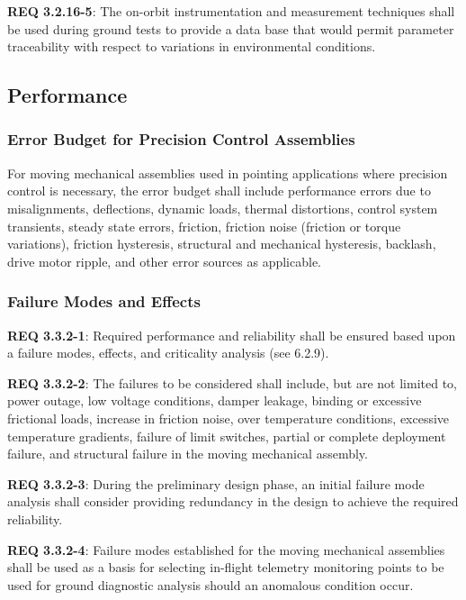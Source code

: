 \documentclass[12pt]{article}
\begin{document}
\noindent \textbf{REQ 3.2.16-5}: The on-orbit instrumentation and measurement techniques shall be used during ground tests to provide a data base that would permit parameter traceability with respect to variations in environmental conditions.


\clearpage
\subsection{Performance} %
\subsubsection{Error Budget for Precision Control Assemblies} %
For moving mechanical assemblies used in pointing applications where precision control is necessary, the error budget shall include performance errors due to misalignments, deflections, dynamic loads, thermal distortions, control system transients, steady state errors, friction, friction noise (friction or torque variations), friction hysteresis, structural and mechanical hysteresis, backlash, drive motor ripple, and other error sources as applicable.


\subsubsection{Failure Modes and Effects} %
\noindent \textbf{REQ 3.3.2-1}: Required performance and reliability shall be ensured based upon a failure modes, effects, and criticality analysis (see 6.2.9). 

\noindent \textbf{REQ 3.3.2-2}: The failures to be considered shall include, but are not limited to, power outage, low voltage conditions, damper leakage, binding or excessive frictional loads, increase in friction noise, over temperature conditions, excessive temperature gradients, failure of limit switches, partial or complete deployment failure, and structural failure in the moving mechanical assembly. 

\noindent \textbf{REQ 3.3.2-3}: During the preliminary design phase, an initial failure mode analysis shall consider providing redundancy in the design to achieve the required reliability. 

\noindent \textbf{REQ 3.3.2-4}: Failure modes established for the moving mechanical assemblies shall be used as a basis for selecting in-flight telemetry monitoring points to be used for ground diagnostic analysis should an anomalous condition occur.
\end{document}
